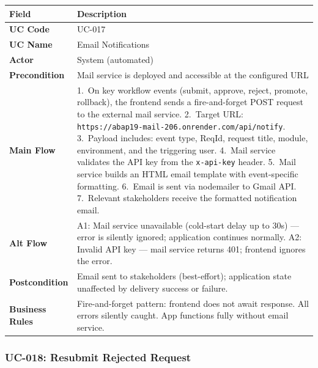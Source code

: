 \documentclass[12pt,a4paper]{report}
\begin{document}
\begin{longtable}{|>{\bfseries}p{2.8cm}|p{12cm}|}
  \hline
  \rowcolor{tableheadpeach}
  \textbf{Field} & \textbf{Description} \\ \hline
  \endhead \hline \endfoot
  UC Code       & UC-017 \\ \hline
  UC Name       & Email Notifications \\ \hline
  Actor         & System (automated) \\ \hline
  Precondition  & Mail service is deployed and accessible at the configured URL \\ \hline
  Main Flow     & 1.~On key workflow events (submit, approve, reject, promote, rollback), the frontend sends a fire-and-forget POST request to the external mail service.
                  2.~Target URL: \texttt{https://abap19-mail-206.onrender.com/api/notify}.
                  3.~Payload includes: event type, ReqId, request title, module, environment, and the triggering user.
                  4.~Mail service validates the API key from the \texttt{x-api-key} header.
                  5.~Mail service builds an HTML email template with event-specific formatting.
                  6.~Email is sent via nodemailer to Gmail API.
                  7.~Relevant stakeholders receive the formatted notification email. \\ \hline
  Alt Flow      & A1: Mail service unavailable (cold-start delay up to 30s) --- error is silently ignored; application continues normally.
                  A2: Invalid API key --- mail service returns 401; frontend ignores the error. \\ \hline
  Postcondition & Email sent to stakeholders (best-effort); application state unaffected by delivery success or failure. \\ \hline
  Business Rules& Fire-and-forget pattern: frontend does not await response. All errors silently caught. App functions fully without email service. \\ \hline
\end{longtable}

\subsubsection{UC-018: Resubmit Rejected Request}
\end{document}
